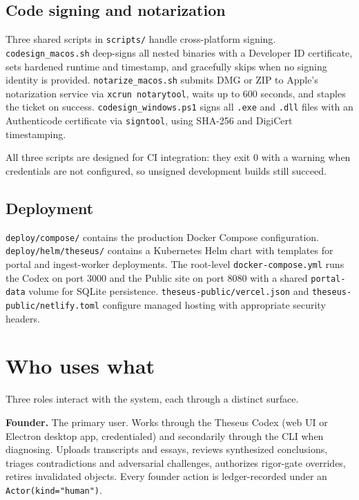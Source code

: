 \documentclass[11pt,letterpaper]{article}
\newcommand{\file}[1]{\texttt{#1}}
\begin{document}
\subsection{Code signing and notarization}

Three shared scripts in \file{scripts/} handle cross-platform signing. \file{codesign\_macos.sh} deep-signs all nested binaries with a Developer ID certificate, sets hardened runtime and timestamp, and gracefully skips when no signing identity is provided. \file{notarize\_macos.sh} submits DMG or ZIP to Apple's notarization service via \texttt{xcrun notarytool}, waits up to 600 seconds, and staples the ticket on success. \file{codesign\_windows.ps1} signs all \texttt{.exe} and \texttt{.dll} files with an Authenticode certificate via \texttt{signtool}, using SHA-256 and DigiCert timestamping.

All three scripts are designed for CI integration: they exit 0 with a warning when credentials are not configured, so unsigned development builds still succeed.

\subsection{Deployment}

\file{deploy/compose/} contains the production Docker Compose configuration. \file{deploy/helm/theseus/} contains a Kubernetes Helm chart with templates for portal and ingest-worker deployments. The root-level \file{docker-compose.yml} runs the Codex on port 3000 and the Public site on port 8080 with a shared \file{portal-data} volume for SQLite persistence. \file{theseus-public/vercel.json} and \file{theseus-public/netlify.toml} configure managed hosting with appropriate security headers.

\section{Who uses what}

Three roles interact with the system, each through a distinct surface.

\textbf{Founder.} The primary user. Works through the Theseus Codex (web UI or Electron desktop app, credentialed) and secondarily through the CLI when diagnosing. Uploads transcripts and essays, reviews synthesized conclusions, triages contradictions and adversarial challenges, authorizes rigor-gate overrides, retires invalidated objects. Every founder action is ledger-recorded under an \texttt{Actor(kind="human")}.
\end{document}
